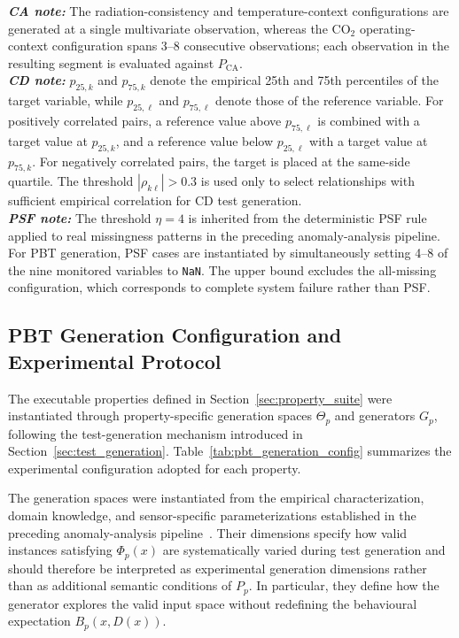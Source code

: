 \documentclass[preprint,12pt]{elsarticle}
\begin{document}
\begin{table}[t]
{\vspace{1mm}
\parbox{\textwidth}{
\scriptsize
\textbf{\textit{CA note:}} The radiation-consistency and temperature-context
configurations are generated at a single multivariate observation, whereas
the CO$_2$ operating-context configuration spans 3--8 consecutive
observations; each observation in the resulting segment is evaluated
against \(P_{\mathrm{CA}}\).\\
\textbf{\textit{CD note:}} \(p_{25,k}\) and \(p_{75,k}\) denote the empirical
25th and 75th percentiles of the target variable, while \(p_{25,\ell}\)
and \(p_{75,\ell}\) denote those of the reference variable. For positively
correlated pairs, a reference value above \(p_{75,\ell}\) is combined
with a target value at \(p_{25,k}\), and a reference value below
\(p_{25,\ell}\) with a target value at \(p_{75,k}\). For negatively
correlated pairs, the target is placed at the same-side quartile.
The threshold \(|\rho_{k\ell}|>0.3\) is used only to select relationships
with sufficient empirical correlation for CD test generation.\\
\textbf{\textit{PSF note:}} The threshold \(\eta=4\) is inherited from the
deterministic PSF rule applied to real missingness patterns in the
preceding anomaly-analysis pipeline. For PBT generation, PSF cases are
instantiated by simultaneously setting 4--8 of the nine monitored
variables to \texttt{NaN}. The upper bound excludes the all-missing
configuration, which corresponds to complete system failure rather than
PSF.
}
}

\end{table}

\subsection{PBT Generation Configuration and Experimental Protocol}
\label{sec:pbt_protocol}

The executable properties defined in Section~\ref{sec:property_suite} were
instantiated through property-specific generation spaces \(\Theta_p\) and
generators \(G_p\), following the test-generation mechanism introduced in
Section~\ref{sec:test_generation}. Table~\ref{tab:pbt_generation_config}
summarizes the experimental configuration adopted for each property.

The generation spaces were instantiated from the empirical characterization,
domain knowledge, and sensor-specific parameterizations established in the
preceding anomaly-analysis pipeline~\cite{carrero2026ifac}. Their dimensions
specify how valid instances satisfying \(\Phi_p(x)\) are systematically
varied during test generation and should therefore be interpreted as
experimental generation dimensions rather than as additional semantic
conditions of \(P_p\). In particular, they define how the generator explores
the valid input space without redefining the behavioural expectation
\(B_p(x,D(x))\).
\end{document}
